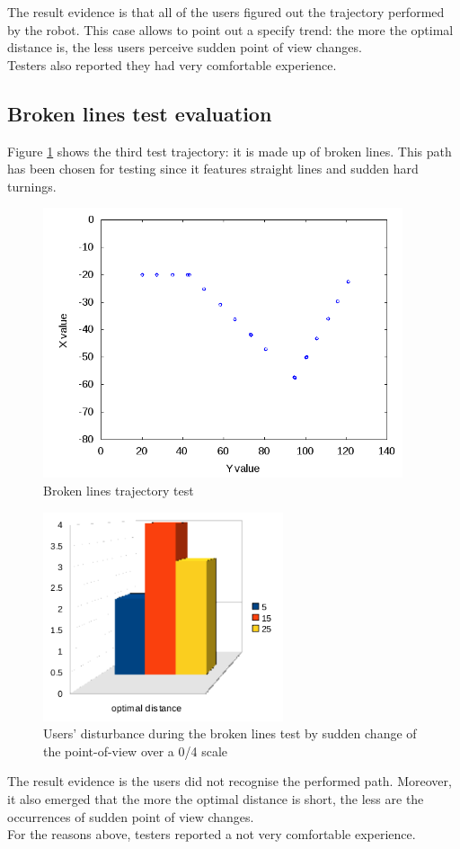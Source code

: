 The result evidence is that all of the users figured out the
trajectory performed by the robot. This case allows to point out
a specify trend: the more the optimal distance is, the less users
perceive sudden point of view changes.
\\
Testers also reported they had very comfortable experience.


\subsection{Broken lines test evaluation}
\label{performance_evaluation:tests_result:zigzagtest}

Figure \ref{fig:zigzagtest} shows the third test trajectory:
it is made up of broken lines. This path has been chosen for testing
since it features straight lines and sudden hard turnings.

\begin{figure}[!h]
  \begin{center}
    \includegraphics[width=300pt]{img/path_session_6.png}
    \caption{Broken lines trajectory test}
    \label{fig:zigzagtest}
  \end{center}
\end{figure}

\begin{figure}[!h]
  \begin{center}
    \includegraphics[width=200pt]{img/zz_results.png}
    \caption{Users' disturbance during the broken lines test 
      by sudden change of the point-of-view over a 0/4 scale}
  \end{center}
\end{figure}

The result evidence is the users did not recognise the performed path.
Moreover, it also emerged that the more the optimal distance is short,
the less are the occurrences of sudden point of view changes.
\\
For the reasons above, testers reported a not very comfortable experience.
